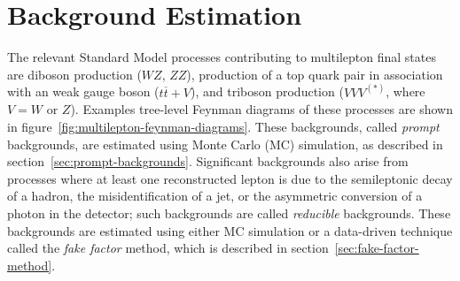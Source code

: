 \chapter{Background Estimation}\label{ch:backgrounds}
The relevant Standard Model processes contributing to multilepton final states are diboson production ($WZ$, $ZZ$), production of a top quark pair in association with an weak gauge boson ($t\overline{t}+V$), and triboson production ($VVV^{(*)}$, where $V=W$ or $Z$). Examples tree-level Feynman diagrams of these processes are shown in figure~\ref{fig:multilepton-feynman-diagrams}. These backgrounds, called \emph{prompt} backgrounds, are estimated using Monte Carlo (MC) simulation, as described in section~\ref{sec:prompt-backgrounds}. Significant backgrounds also arise from processes where at least one reconstructed lepton is due to the semileptonic decay of a hadron, the misidentification of a jet, or the asymmetric conversion of a photon in the detector; such backgrounds are called \emph{reducible} backgrounds. These backgrounds are estimated using either MC simulation or a data-driven technique called the \emph{fake factor} method, which is described in section~\ref{sec:fake-factor-method}. 


